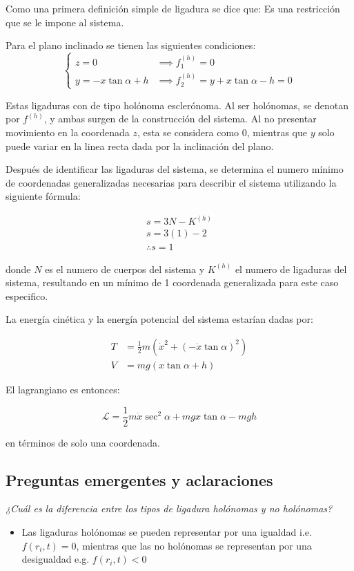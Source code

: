 \documentclass{article}
\theoremstyle{definition}
\begin{document}
Como una primera definición simple de ligadura se dice que: Es una restricción que se le impone al sistema.

Para el plano inclinado se tienen las siguientes condiciones:
\begin{equation}
	\begin{cases}
		z = 0 &\implies f_1^{(h)} = 0 \\
		y = -x\tan{\alpha} + h &\implies f_2^{(h)} = y + x\tan{\alpha} - h = 0
	\end{cases}
\end{equation}

Estas ligaduras con de tipo holónoma esclerónoma. Al ser holónomas, se denotan por $f^{(h)}$, y ambas surgen de la construcción del sistema. Al no presentar movimiento en la coordenada $z$, esta se considera como $0$, mientras que $y$ solo puede variar en la linea recta dada por la inclinación del plano.

Después de identificar las ligaduras del sistema, se determina el numero mínimo de coordenadas generalizadas necesarias para describir el sistema utilizando la siguiente fórmula:

\begin{gather}
	s = 3N - K^{(h)} \label{eq:minim_coordinates}\\
	s = 3(1) - 2 \\
	\therefore s = 1
\end{gather}

donde $N$ es el numero de cuerpos del sistema y $K^{(h)}$ el numero de ligaduras del sistema, resultando en un mínimo de 1 coordenada generalizada para este caso especifico.

La energía cinética y la energía potencial del sistema estarían dadas por:

\begin{align}
	T &= \frac{1}{2} m \left(\dot{x}^2 + (-\dot{x}\tan{\alpha})^2 \right) \\
	V &= mg\left(x\tan{\alpha} + h \right)
\end{align}

El lagrangiano es entonces:

\begin{equation}
	\mathcal{L} = \frac{1}{2}m\dot{x}\sec^2{\alpha} + mgx\tan{\alpha} - mgh
\end{equation}

en términos de solo una coordenada.

\subsection{Preguntas emergentes y aclaraciones}
\emph{¿Cuál es la diferencia entre los tipos de ligadura holónomas y no holónomas?}
\begin{itemize}
	\item Las ligaduras holónomas se pueden representar por una igualdad i.e. $f(r_i, t) = 0$, mientras que las no holónomas se representan por una desigualdad e.g. $f(r_i, t) < 0$
\end{itemize}
\end{document}

